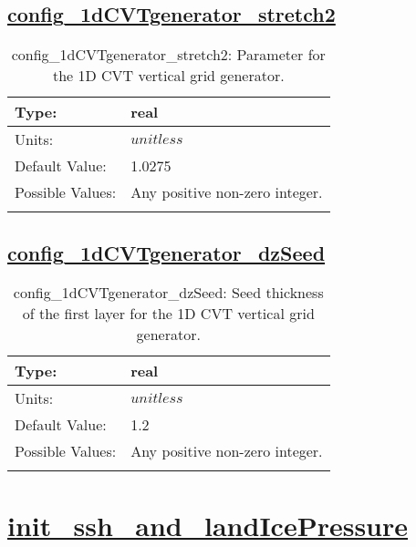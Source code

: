 \subsection[config\_1dCVTgenerator\_stretch2]{\hyperref[sec:nm_tab_CVTgenerator]{config\_1dCVTgenerator\_stretch2}}
\label{subsec:nm_sec_config_1dCVTgenerator_stretch2}
\begin{center}
\begin{longtable}{| p{2.0in} || p{4.0in} |}
    \hline
    Type: & real \\
    \hline
    Units: & $unitless$ \\
    \hline
    Default Value: & 1.0275 \\
    \hline
    Possible Values: & Any positive non-zero integer. \\
    \hline
    \caption{config\_1dCVTgenerator\_stretch2: Parameter for the 1D CVT vertical grid generator.}
\end{longtable}
\end{center}
\subsection[config\_1dCVTgenerator\_dzSeed]{\hyperref[sec:nm_tab_CVTgenerator]{config\_1dCVTgenerator\_dzSeed}}
\label{subsec:nm_sec_config_1dCVTgenerator_dzSeed}
\begin{center}
\begin{longtable}{| p{2.0in} || p{4.0in} |}
    \hline
    Type: & real \\
    \hline
    Units: & $unitless$ \\
    \hline
    Default Value: & 1.2 \\
    \hline
    Possible Values: & Any positive non-zero integer. \\
    \hline
    \caption{config\_1dCVTgenerator\_dzSeed: Seed thickness of the first layer for the 1D CVT vertical grid generator.}
\end{longtable}
\end{center}
\section[init\_ssh\_and\_landIcePressure]{\hyperref[sec:nm_tab_init_ssh_and_landIcePressure]{init\_ssh\_and\_landIcePressure}}
\label{sec:nm_sec_init_ssh_and_landIcePressure}
